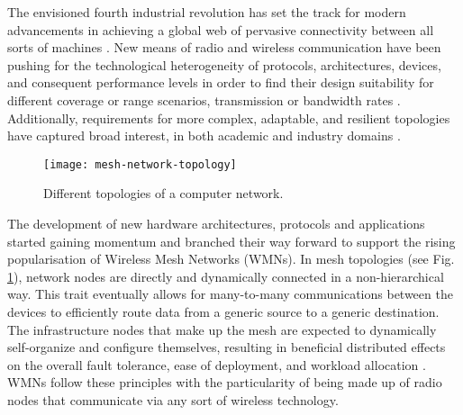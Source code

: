 The envisioned fourth industrial revolution has set the track for modern advancements in achieving a global web of pervasive connectivity between all sorts of machines \cite{akyildiz2005wireless, cilfone2019wireless}. New means of radio and wireless communication have been pushing for the technological heterogeneity of protocols, architectures, devices, and consequent performance levels in order to find their design suitability for different coverage or range scenarios, transmission or bandwidth rates \cite{sichitiu2005wireless}. Additionally, requirements for more complex, adaptable, and resilient topologies have captured broad interest, in both academic and industry domains \cite{cilfone2019wireless}. 

\begin{figure} [ht]
  \begin{center}
  \texttt{[image: mesh-network-topology]}
  \caption{Different topologies of a computer network.}
  \label{fig:mesh-network-topology}
  \end{center}
\end{figure}


The development of new hardware architectures, protocols and applications started gaining momentum and branched their way forward to support the rising popularisation of Wireless Mesh Networks (WMNs). In mesh topologies (see Fig. \ref{fig:mesh-network-topology}), network nodes are directly and dynamically connected in a non-hierarchical way. This trait eventually allows for many-to-many communications between the devices to efficiently route data from a generic source to a generic destination. The infrastructure nodes that make up the mesh are expected to dynamically self-organize and configure themselves, resulting in beneficial distributed effects on the overall fault tolerance, ease of deployment, and workload allocation \cite{cilfone2019wireless, sichitiu2005wireless}. WMNs follow these principles with the particularity of being made up of radio nodes that communicate via any sort of wireless technology.

